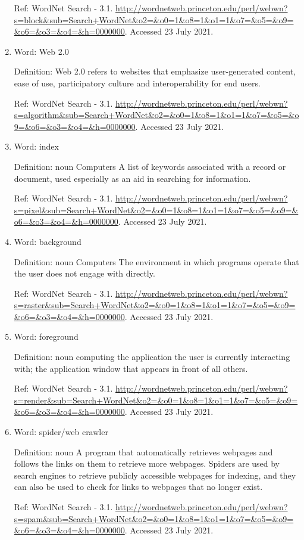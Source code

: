 \documentclass{scrartcl}
\begin{document}
\begin{enumerate}
Ref: WordNet Search - 3.1. \url{http://wordnetweb.princeton.edu/perl/webwn?s=block\&sub=Search+WordNet\&o2=\&o0=1\&o8=1\&o1=1\&o7=\&o5=\&o9=\&o6=\&o3=\&o4=\&h=0000000}. Accessed 23 July 2021.

\item Word: Web 2.0

Definition:  Web 2.0 refers to websites that emphasize user-generated content, ease of use, participatory culture and interoperability for end users.

Ref: WordNet Search - 3.1. \url{http://wordnetweb.princeton.edu/perl/webwn?s=algorithm\&sub=Search+WordNet\&o2=\&o0=1\&o8=1\&o1=1\&o7=\&o5=\&o9=\&o6=\&o3=\&o4=\&h=0000000}. Accessed 23 July 2021.

\item Word: index

Definition:   noun Computers  A list of keywords associated with a record or document, used especially as an aid in searching for information.

Ref: WordNet Search - 3.1. \url{http://wordnetweb.princeton.edu/perl/webwn?s=pixel\&sub=Search+WordNet\&o2=\&o0=1\&o8=1\&o1=1\&o7=\&o5=\&o9=\&o6=\&o3=\&o4=\&h=0000000}. Accessed 23 July 2021.

\item Word: background

Definition: noun Computers  The environment in which programs operate that the user does not engage with directly.

Ref: WordNet Search - 3.1. \url{http://wordnetweb.princeton.edu/perl/webwn?s=raster\&sub=Search+WordNet\&o2=\&o0=1\&o8=1\&o1=1\&o7=\&o5=\&o9=\&o6=\&o3=\&o4=\&h=0000000}. Accessed 23 July 2021.

\item Word: foreground

Definition: noun computing  the application the user is currently interacting with; the application window that appears in front of all others.

Ref: WordNet Search - 3.1. \url{http://wordnetweb.princeton.edu/perl/webwn?s=render\&sub=Search+WordNet\&o2=\&o0=1\&o8=1\&o1=1\&o7=\&o5=\&o9=\&o6=\&o3=\&o4=\&h=0000000}. Accessed 23 July 2021.

\item Word: spider/web crawler

Definition:  noun   A program that automatically retrieves webpages and follows the links on them to retrieve more webpages. Spiders are used by search engines to retrieve publicly accessible webpages for indexing, and they can also be used to check for links to webpages that no longer exist.

Ref: WordNet Search - 3.1. \url{http://wordnetweb.princeton.edu/perl/webwn?s=spam\&sub=Search+WordNet\&o2=\&o0=1\&o8=1\&o1=1\&o7=\&o5=\&o9=\&o6=\&o3=\&o4=\&h=0000000}. Accessed 23 July 2021.
\end{enumerate}
\end{document}
